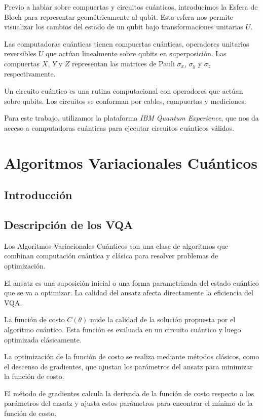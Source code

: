 \documentclass[11pt, spanish, letterpage]{report} %
\newcommand{\1}{\mathbb{1}}
\newcounter{problem}[section]
\begin{document}
Previo a hablar sobre compuertas y circuitos cuánticos, introducimos la Esfera de Bloch para representar geométricamente al qubit. Esta esfera nos permite visualizar los cambios del estado de un qubit bajo transformaciones unitarias $U$. 

Las computadoras cuánticas tienen compuertas cuánticas, operadores unitarios reversibles $U$ que actúan linealmente sobre qubits en superposición. Las compuertas $X$, $Y$ y $Z$ representan las matrices de Pauli $\sigma_x$, $\sigma_y$ y $\sigma_z$ respectivamente.

Un circuito cuántico es una rutina computacional con operadores que actúan sobre qubits. Los circuitos se conforman por cables, compuertas y mediciones.

Para este trabajo, utilizamos la plataforma \textit{IBM Quantum Experience}, que nos da acceso a computadoras cuánticas para ejecutar circuitos cuánticos válidos. 

\chapter{Algoritmos Variacionales Cuánticos}
\section{Introducción}
\section{Descripción de los VQA}
Los Algoritmos Variacionales Cuánticos son una clase de algoritmos que combinan computación cuántica y clásica para resolver problemas de optimización. 

El ansatz es una suposición inicial o una forma parametrizada del estado cuántico que se va a optimizar. La calidad del ansatz afecta directamente la eficiencia del VQA.

La función de costo $C(\theta)$ mide la calidad de la solución propuesta por el algoritmo cuántico. Esta función es evaluada en un circuito cuántico y luego optimizada clásicamente.

La optimización de la función de costo se realiza mediante métodos clásicos, como el descenso de gradientes, que ajustan los parámetros del ansatz para minimizar la función de costo.

El método de gradientes calcula la derivada de la función de costo respecto a los parámetros del ansatz y ajusta estos parámetros para encontrar el mínimo de la función de costo.
\end{document}
